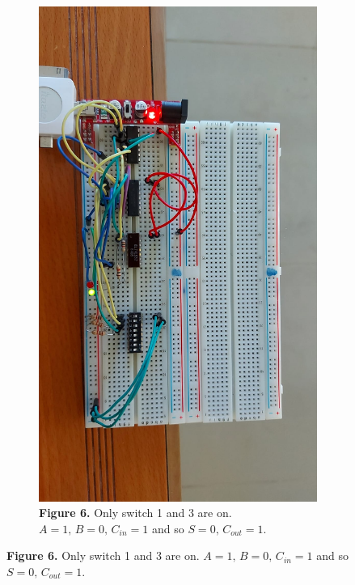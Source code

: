 \documentclass[a4paper]{article}
\begin{document}
\begin{figure}
\begin{subfigure}[b]{0.9\textwidth}
         \centering
        \includegraphics[angle=90, width=\textwidth]{13on.jpeg}
          \caption*{\textbf{Figure 6.} Only switch 1 and 3 are on. $A=1,\,B=0,\, C_{in} = 1$ and so $S=0,\,C_{out}=1$.\vspace{2em}}
         \label{fig:1on}
     \end{subfigure}
   \end{figure}
\end{document}
